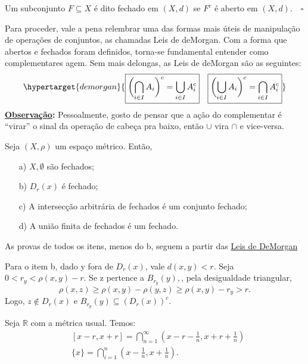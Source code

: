 \documentclass[MetricSpaces/metric_notes.tex]{subfiles}
\begin{document}
\begin{def*}
	Um subconjunto \(F\subseteq{X}\) é dito fechado em \((X, d)\) se \(F^{c}\) é aberto em \((X, d).\quad\square\)
\end{def*}
Para proceder, vale a pena relembrar uma das formas mais úteis de manipulação de operações de conjuntos, as chamadas Leis de deMorgan. Com a forma que abertos e fechados foram definidos,
torna-se fundamental entender como complementares agem. Sem mais delongas, as Leis de deMorgan são as seguintes:
\[
	\hypertarget{demorgan}{\boxed{\biggl(\bigcap_{i\in I}^{}{A_{i}}\biggr)^{c} = \bigcup_{i\in I}^{}{A_{i}^{c}}}\quad\boxed{\biggl(\bigcup_{i\in I}^{}{A_{i}}\biggr)^{c} = \bigcap_{i\in I}^{}{A_{i}^{c}}}}
\]
\textbf{\underline{Observação}:} Pessoalmente, gosto de pensar que a ação do complementar é ``virar'' o sinal da operação de cabeça pra baixo, então \(\cup\) vira \(\cap\) e vice-versa.
\begin{prop*}
	Seja \((X, \rho )\) um espaço métrico. Então,
	\begin{itemize}
		\item[a)] \(X, \emptyset\) são fechados;
		\item[b)] \(D_{r}(x)\) é fechado;
		\item[c)] A intersecção arbitrária de fechados é um conjunto fechado;
		\item[d)] A união finita de fechados é um fechado.
	\end{itemize}
\end{prop*}
\begin{proof*}
	As provas de todos os itens, menos do b, seguem a partir das \hyperlink{demorgan}{Leis de DeMorgan}

	Para o item b, dado y fora de \(D_{r}(x)\), vale \(d(x, y) < r.\) Seja \(0 < r_{y} < \rho (x, y) - r.\) Se z pertence a \(B_{r_{y}}(y),\), pela desigualdade triangular,
	\[
		\rho (x, z)\geq \rho (x, y) - \rho (y, z)\geq \rho (x, y) - r_{y} > r.
	\]
	Logo, \(z\not\in D_{r}(x)\) e \(B_{r_{y}}(y)\subseteq{(D_{r}(x))^{c}}.\) \qedsymbol
\end{proof*}
\begin{example}
	Seja \(\mathbb{R}\) com a métrica usual. Temos:
	\begin{align*}
		 & [x-r, x+r]=\bigcap_{n=1}^{\infty}{(x-r-\frac{1}{n}, x+r+\frac{1}{n})} \\
		 & \{x\} = \bigcap_{i=1}^{n}{(x-\frac{1}{n}, x+\frac{1}{n})}.
	\end{align*}
\end{example}
\end{document}
